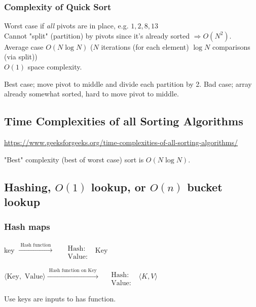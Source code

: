 \documentclass[10pt]{amsart}
\begin{document}
\subsubsection{Complexity of Quick Sort}

Worst case if \emph{all} pivots are in place, e.g. $1,2,8,13$ \\
Cannot "split" (partition) by pivots since it's already sorted $\Longrightarrow O(N^2)$. \\
Average case $O(N\log{N})$ ($N$ iterations (for each element) $\log{N}$ comparisons (via split)) \\
$O(1)$ space complexity.

Best case; move pivot to middle and divide each partition by 2.
Bad case; array already somewhat sorted, hard to move pivot to middle.

\subsection{Time Complexities of all Sorting Algorithms}

\url{https://www.geeksforgeeks.org/time-complexities-of-all-sorting-algorithms/}

"Best" complexity (best of worst case) sort is $O(N \log{N})$.


\subsection{Hashing, $O(1)$ lookup, or $O(n)$ bucket lookup}


\subsubsection{Hash maps} 

key $\xrightarrow{ \text{ Hash function } }$  $\begin{aligned} & \quad \\ 
& \text{ Hash: } \\
& \text{ Value: } \end{aligned}$ Key 

$\langle \text{Key}, \text{ Value} \rangle \xrightarrow{ \text{ Hash function on Key } } \begin{aligned} & \quad \\ 
	& \text{ Hash: } \\
	& \text{ Value: } \end{aligned}$ \quad $\langle K , V \rangle$ 

Use keys are inputs to has function.
\end{document}
